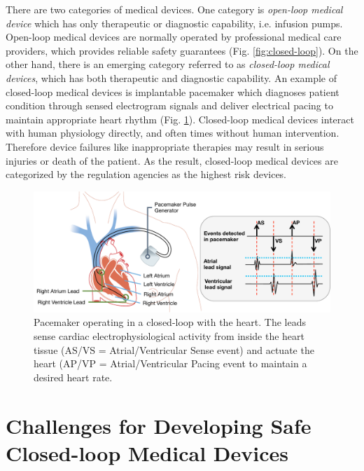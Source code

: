 \documentclass[a4paper]{article}
\begin{document}
There are two categories of medical devices. 
One category is \emph{open-loop medical device} which has only therapeutic or diagnostic capability, i.e. infusion pumps. 
Open-loop medical devices are normally operated by professional medical care providers, which provides reliable safety guarantees (Fig. \ref{fig:closed-loop}).
On the other hand, there is an emerging category referred to as \emph{closed-loop medical devices}, which has both therapeutic and diagnostic capability.
An example of closed-loop medical devices is implantable pacemaker which diagnoses patient condition through sensed electrogram signals and deliver electrical pacing to maintain appropriate heart rhythm (Fig. \ref{fig:pacemaker}). 
Closed-loop medical devices interact with human physiology directly, and often times without human intervention.
Therefore device failures like inappropriate therapies may result in serious injuries or death of the patient.
As the result, closed-loop medical devices are categorized by the regulation agencies as the highest risk devices.
\begin{figure}[b]
	\centering
	\includegraphics[scale=0.35]{figs/fig1pacemaker.pdf}
	\caption{\small Pacemaker operating in a closed-loop with the heart. The leads sense cardiac electrophysiological activity from inside the heart tissue (AS/VS = Atrial/Ventricular Sense event) and actuate the heart (AP/VP = Atrial/Ventricular Pacing event to maintain a desired heart rate.}
	\label{fig:pacemaker}
\end{figure}
\section{Challenges for Developing Safe Closed-loop Medical Devices}
\end{document}
